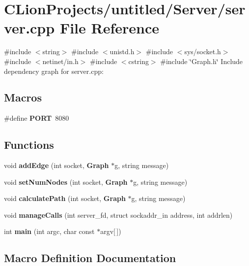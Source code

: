 \section{C\+Lion\+Projects/untitled/\+Server/server.cpp File Reference}
\label{server_8cpp}
{\ttfamily \#include $<$string$>$}\newline
{\ttfamily \#include $<$unistd.\+h$>$}\newline
{\ttfamily \#include $<$sys/socket.\+h$>$}\newline
{\ttfamily \#include $<$netinet/in.\+h$>$}\newline
{\ttfamily \#include $<$cstring$>$}\newline
{\ttfamily \#include \char`\"{}Graph.\+h\char`\"{}}\newline
Include dependency graph for server.\+cpp\+:
\subsection*{Macros}
\begin{DoxyCompactItemize}
\item 
\#define \textbf{ P\+O\+RT}~8080
\end{DoxyCompactItemize}
\subsection*{Functions}
\begin{DoxyCompactItemize}
\item 
void \textbf{ add\+Edge} (int socket, \textbf{ Graph} $\ast$g, string message)
\item 
void \textbf{ set\+Num\+Nodes} (int socket, \textbf{ Graph} $\ast$g, string message)
\item 
void \textbf{ calculate\+Path} (int socket, \textbf{ Graph} $\ast$g, string message)
\item 
void \textbf{ manage\+Calls} (int server\+\_\+fd, struct sockaddr\+\_\+in address, int addrlen)
\item 
int \textbf{ main} (int argc, char const $\ast$argv[$\,$])
\end{DoxyCompactItemize}


\subsection{Macro Definition Documentation}
\mbox{\label{server_8cpp_a614217d263be1fb1a5f76e2ff7be19a2}} 
